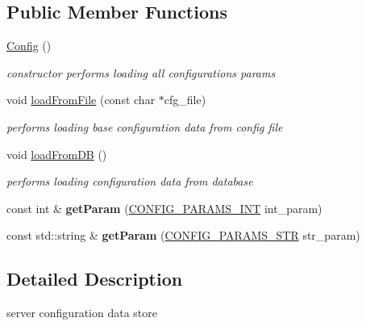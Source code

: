 \subsection*{\-Public \-Member \-Functions}
\begin{DoxyCompactItemize}
\item 
\hypertarget{classConfig_abd0c571c116924871e30444b192b792a}{\hyperlink{classConfig_abd0c571c116924871e30444b192b792a}{\-Config} ()}\label{classConfig_abd0c571c116924871e30444b192b792a}

\begin{DoxyCompactList}\small\item\em constructor performs loading all configurations params \end{DoxyCompactList}\item 
void \hyperlink{classConfig_a0a2ae073a94b6d495a6113e01a0563db}{load\-From\-File} (const char $\ast$cfg\-\_\-file)
\begin{DoxyCompactList}\small\item\em performs loading base configuration data from config file \end{DoxyCompactList}\item 
void \hyperlink{classConfig_a182d6c22c9a9e09b7a38b0339bc742b1}{load\-From\-D\-B} ()
\begin{DoxyCompactList}\small\item\em performs loading configuration data from database \end{DoxyCompactList}\item 
\hypertarget{classConfig_adb59977d3f13d7a1223e6c7523240c7b}{const int \& {\bfseries get\-Param} (\hyperlink{classConfig_a0f80a094ada73f8574e85b160a5e47b7}{\-C\-O\-N\-F\-I\-G\-\_\-\-P\-A\-R\-A\-M\-S\-\_\-\-I\-N\-T} int\-\_\-param)}\label{classConfig_adb59977d3f13d7a1223e6c7523240c7b}

\item 
\hypertarget{classConfig_a8e5fe138e08e23bf25b118c0cfb948dc}{const std\-::string \& {\bfseries get\-Param} (\hyperlink{classConfig_a6d78e4d65fd44d149ad6facce11bc11e}{\-C\-O\-N\-F\-I\-G\-\_\-\-P\-A\-R\-A\-M\-S\-\_\-\-S\-T\-R} str\-\_\-param)}\label{classConfig_a8e5fe138e08e23bf25b118c0cfb948dc}

\end{DoxyCompactItemize}


\subsection{\-Detailed \-Description}
server configuration data store 

